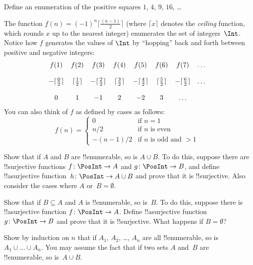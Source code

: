 \documentclass[../../../include/open-logic-section]{subfiles}
\begin{document}
\begin{prob}
Define an enumeration of the positive squares $1$, $4$, $9$, $16$, \dots
\end{prob}

\begin{ex}
The function $f(n) = (-1)^{n} \lceil \frac{(n-1)}{2}\rceil$ (where
$\lceil x \rceil$ denotes the \emph{ceiling} function, which rounds
$x$ up to the nearest integer) enumerates the set of
integers~$\Int$. Notice how $f$ generates the values of $\Int$ by
``hopping'' back and forth between positive and negative integers:
\[
\begin{array}{c c c c c c c c}
f(1) & f(2) & f(3) & f(4) & f(5) & f(6) & f(7) & \dots \\ \\
- \lceil \tfrac{0}{2} \rceil & \lceil \tfrac{1}{2}\rceil & - \lceil \tfrac{2}{2} \rceil & \lceil \tfrac{3}{2} \rceil & - \lceil \tfrac{4}{2} \rceil  & \lceil \tfrac{5}{2}
\rceil & - \lceil \tfrac{6}{2} \rceil & \dots \\ \\
0 & 1 & -1 & 2 & -2 & 3 & \dots
\end{array}
\]
You can also think of $f$ as defined by cases as follows:
\[
f(n) = \begin{cases}
  0 & \text{if $n = 1$}\\
  n/2 & \text{if $n$ is even}\\
  -(n-1)/2 & \text{if $n$ is odd and $>1$}
  \end{cases}
\]
\end{ex}

\begin{prob}
  Show that if $A$ and $B$ are !!{enumerable}, so is $A \cup B$. To do
  this, suppose there are !!{surjective} functions $f\colon \PosInt \to
  A$ and $g\colon \PosInt \to B$, and define !!a{surjective}
  function~$h\colon \PosInt \to A \cup B$ and prove that it is
  !!{surjective}. Also consider the cases where $A$ or~$B = \emptyset$.
\end{prob}
  
\begin{prob}
  Show that if $B \subseteq A$ and $A$ is !!{enumerable}, so is~$B$. To
  do this, suppose there is !!a{surjective} function $f\colon \PosInt \to
  A$. Define !!a{surjective} function~$g\colon \PosInt \to B$ and prove
  that it is !!{surjective}. What happens if $B = \emptyset$?
\end{prob}
    
\begin{prob}
  Show by induction on $n$ that if $A_1$, $A_2$, \dots, $A_n$ are all
  !!{enumerable}, so is $A_1 \cup \dots \cup A_n$. You may assume the
  fact that if two sets $A$ and~$B$ are !!{enumerable}, so is~$A \cup
  B$. 
\end{prob}
\end{document}
